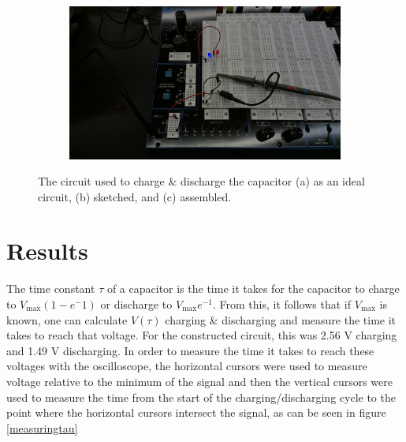 \documentclass{article}
\begin{document}
\begin{figure}[h]
\begin{subfigure}{\textwidth/3}
                \includegraphics[width=\linewidth]{circuit.jpg}
                \caption{}
            \end{subfigure}
            \caption{The circuit used to charge \& discharge the capacitor (a) as an ideal circuit, (b) sketched, and (c) assembled.}
            \label{circuitry}
        \end{figure}


\section{Results}
    The time constant $\tau$ of a capacitor is the time it takes for the capacitor to charge to $V_\mathrm{max}(1-e^-1)$ or discharge to $V_\mathrm{max}e^{-1}$. From this, it follows that if $V_\mathrm{max}$ is known, one can calculate $V(\tau)$ charging \& discharging and measure the time it takes to reach that voltage.
    For the constructed circuit, this was 2.56 V charging and 1.49 V discharging.
    In order to measure the time it takes to reach these voltages with the oscilloscope, the horizontal cursors were used to measure voltage relative to the minimum of the signal and then the vertical cursors were used to measure the time from the start of the charging/discharging cycle to the point where the horizontal cursors intersect the signal, as can be seen in figure \ref{measuringtau}
\end{document}
